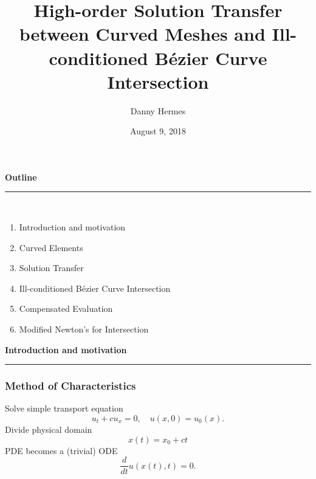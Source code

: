 \documentclass{beamer}
\title[Lagrange and B\'{e}zier]
  {High-order Solution Transfer between Curved Meshes and
  Ill-conditioned B\'{e}zier Curve Intersection}
\date{August 9, 2018}
\author{Danny Hermes}
\institute{{\lmss dhermes@berkeley.edu} \\
           UC Berkeley}
\begin{document}
\maketitle

\begin{frame}
\centering
{\Large\bf Outline} \\
\rule{0.82\textwidth}{1pt} \\[20pt]
\begin{minipage}{0.78\textwidth}\raggedright
\begin{enumerate}
\item Introduction and motivation
\item Curved Elements
\item Solution Transfer
\item Ill-conditioned B\'{e}zier Curve Intersection
\item Compensated Evaluation
\item Modified Newton's for Intersection
\end{enumerate}
\end{minipage}
\end{frame}


\begin{frame}
\centering
{\Large \bf Introduction and motivation}
\rule{0.82\textwidth}{1pt}
\end{frame}

\begin{frame}
\frametitle{Method of Characteristics}
\pause
Solve simple transport equation
\begin{equation*}
u_t + c u_x = 0, \quad u(x, 0) = u_0(x).
\end{equation*}
\pause
Divide physical domain
\begin{equation*}
x(t) = x_0 + ct
\end{equation*}
\pause
PDE becomes a (trivial) ODE
\begin{equation*}
\frac{d}{dt} u(x(t), t) = 0.
\end{equation*}
\end{frame}
\end{document}
